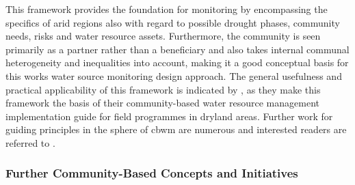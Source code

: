 
This framework provides the foundation for monitoring by encompassing the specifics of arid regions also with regard to possible drought phases, community needs, risks and water resource assets. Furthermore, the community is seen primarily as a partner rather than a beneficiary and also takes internal communal heterogeneity and inequalities into account, making it a good conceptual basis for this works water source monitoring design approach. The general usefulness and practical applicability of this framework is indicated by \autocite{oxfamIntroductionCommunityBasedWater2009}, as they make this framework the basis of their community-based water resource management implementation guide for field programmes in dryland areas. Further work for guiding principles in the sphere of \acrshort{cbwm} are numerous and interested readers are referred to \autocite{westonCommunityBasedWaterMonitoring2015}.

\subsubsection*{Further Community-Based Concepts and Initiatives}\label{subsec:cbc} %

